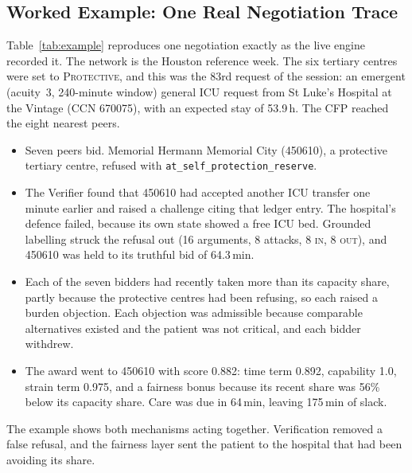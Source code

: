 \subsection{Worked Example: One Real Negotiation Trace}
\label{sec:example}
Table~\ref{tab:example} reproduces one negotiation exactly as the live engine recorded it. The network is the Houston reference week. The six tertiary centres were set to \textsc{Protective}, and this was the 83rd request of the session: an emergent (acuity~3, 240-minute window) general ICU request from St Luke's Hospital at the Vintage (CCN 670075), with an expected stay of 53.9\,h. The CFP reached the eight nearest peers.
\begin{itemize}
\setlength{\itemsep}{1pt}
\item Seven peers bid. Memorial Hermann Memorial City (450610), a protective tertiary centre, refused with \texttt{at\_self\_protection\_reserve}.
\item The Verifier found that 450610 had accepted another ICU transfer one minute earlier and raised a challenge citing that ledger entry. The hospital's defence failed, because its own state showed a free ICU bed. Grounded labelling struck the refusal out (16 arguments, 8 attacks, 8 \textsc{in}, 8 \textsc{out}), and 450610 was held to its truthful bid of 64.3\,min.
\item Each of the seven bidders had recently taken more than its capacity share, partly because the protective centres had been refusing, so each raised a burden objection. Each objection was admissible because comparable alternatives existed and the patient was not critical, and each bidder withdrew.
\item The award went to 450610 with score 0.882: time term 0.892, capability 1.0, strain term 0.975, and a fairness bonus because its recent share was 56\% below its capacity share. Care was due in 64\,min, leaving 175\,min of slack.
\end{itemize}
The example shows both mechanisms acting together. Verification removed a false refusal, and the fairness layer sent the patient to the hospital that had been avoiding its share.

